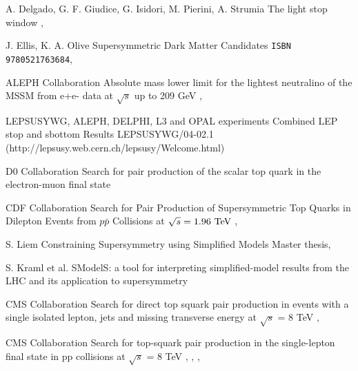{A. Delgado, G. F. Giudice, G. Isidori, M. Pierini, A. Strumia}
{The light stop window}
{, }

{J. Ellis, K. A. Olive}
{Supersymmetric Dark Matter Candidates}
{\texttt{ISBN 9780521763684}, }

{ALEPH Collaboration}
{Absolute mass lower limit for the lightest neutralino of the MSSM from e+e- data at $\sqrt{s}$ up to 209 GeV}
{, }

{LEPSUSYWG, ALEPH, DELPHI, L3 and OPAL experiments}
{Combined LEP stop and sbottom Results}
{LEPSUSYWG/04-02.1 (http://lepsusy.web.cern.ch/lepsusy/Welcome.html)}

{D0 Collaboration}
{Search for pair production of the scalar top quark in the electron-muon final state}
{ }

{CDF Collaboration}
{Search for Pair Production of Supersymmetric Top Quarks in Dilepton Events from $p\bar{p}$ Collisions at $\sqrt{s} = 1.96~\text{TeV}$}
{,  }

{S. Liem}
{Constraining Supersymmetry using Simplified Models}
{Master thesis, }

{S. Kraml et al.}
{SModelS: a tool for interpreting simplified-model results from the LHC and its application to supersymmetry}
{ }


{CMS Collaboration}
{Search for direct top squark pair production in events with a single isolated lepton, jets and missing transverse energy at $\sqrt{s}$ = 8 TeV}
{, }

{CMS Collaboration}
{Search for top-squark pair production in the single-lepton final state in pp collisions at $\sqrt{s}$ = 8 TeV}
{, , , }

